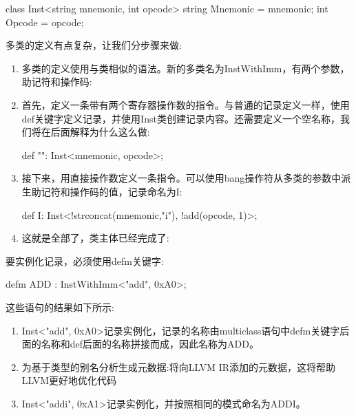 \begin{shell}
class Inst<string mnemonic, int opcode> {
    string Mnemonic = mnemonic;
    int Opcode = opcode;
}
\end{shell}

多类的定义有点复杂，让我们分步骤来做:

\begin{enumerate}
\item
多类的定义使用与类相似的语法。新的多类名为InstWithImm，有两个参数，助记符和操作码:

\begin{shell}
multiclass InstWithImm<string mnemonic, int opcode> {
\end{shell}

\item
首先，定义一条带有两个寄存器操作数的指令。与普通的记录定义一样，使用def关键字定义记录，并使用Inst类创建记录内容。还需要定义一个空名称，我们将在后面解释为什么这么做:

\begin{shell}
    def "": Inst<mnemonic, opcode>;
\end{shell}

\item
接下来，用直接操作数定义一条指令。可以使用bang操作符从多类的参数中派生助记符和操作码的值，记录命名为I:

\begin{shell}
    def I: Inst<!strconcat(mnemonic,"i"), !add(opcode, 1)>;
\end{shell}

\item
这就是全部了，类主体已经完成了:

\begin{shell}
}
\end{shell}
\end{enumerate}

要实例化记录，必须使用defm关键字:

\begin{shell}
defm ADD : InstWithImm<"add", 0xA0>;
\end{shell}

这些语句的结果如下所示:

\begin{enumerate}
\item
Inst<"add", 0xA0>记录实例化，记录的名称由multiclass语句中defm关键字后面的名称和def后面的名称拼接而成，因此名称为ADD。

\item
为基于类型的别名分析生成元数据:将向LLVM IR添加的元数据，这将帮助LLVM更好地优化代码

\item
Inst<"addi", 0xA1>记录实例化，并按照相同的模式命名为ADDI。
\end{enumerate}

